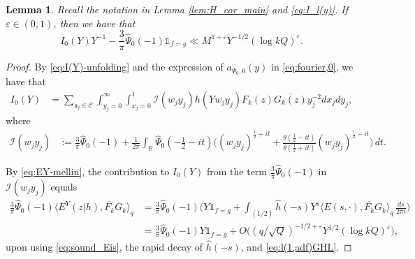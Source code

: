 \documentclass[12pt,reqno]{amsart}
\newtheorem{lem}[thm]{Lemma}
\theoremstyle{remark}
\numberwithin{equation}{section}
\begin{document}
        \begin{lem}
        \label{lem:I_0(Y)}
            Recall the notation in Lemma \ref{lem:H_cor_main} and \eqref{eq:I_l(y)}. If $\varepsilon \in (0,1)$, then we have that
            \[
           I_0(Y)Y^{-1} - \frac{3}{\pi}\widehat{\Psi}_0(-1)\mathds{1}_{f=g} \ll M^{1+\varepsilon}Y^{-1/2}(\log kQ)^\varepsilon.
            \]
        \end{lem}
        \begin{proof} By \eqref{eq:I(Y)-unfolding} and the expression of $a_{\Psi_0,0}(y)$ in \eqref{eq:fourier,0}, we have that
        \begin{align}
        \label{eq:IES-1}
		I_0(Y)
        &= \sum_{\mathfrak{a}_j \in \mathcal{C}} \int_{y_j=0}^{\infty}\int_{x_j =0}^1 \mathscr{I}(w_j y_j)h(Yw_jy_j) F_k(z)\overline{G_k(z)}  {y_j^{-2}}dx_jdy_j,
        \end{align}
        where
        \begin{align*}
        \mathscr{I}(w_jy_j) &:=   \frac{3}{\pi}\widehat{\Psi}_0(-1)
        + \frac{1}{2\pi}\int_\mathbb{R} \widehat{\Psi}_0(-\tfrac{1}{2}-it)
        \Big((w_jy_j)^{\frac{1}{2}+it} + \frac{\theta(\frac{1}{2}-it)}{\theta(\frac{1}{2}+it)}(w_jy_j)^{\frac{1}{2}-it}\Big)\, dt.
	\end{align*}
    
   
        By \eqref{eq:EY-mellin}, the contribution to $I_0(Y)$ from the term $\frac{3}{\pi}\widehat{\Psi}_0(-1)$ in $\mathscr{I}(w_jy_j)$  equals
        \begin{equation}
        \begin{aligned}
        \label{eq:cor-IES-5}
            \frac{3}{\pi}\widehat{\Psi}_0(-1) \langle E^Y(z|h), \overline{F_k}G_k\rangle_q 
            &=\frac{3}{\pi}\widehat{\Psi}_0(-1)\Big(Y \mathds{1}_{f=g}+ \int_{(1/2)}\widehat{h}(-s)Y^s \langle E(s,\cdot), \overline{F_k}G_k\rangle_q \,\frac{ds}{2\pi i}\Big)\\
            &= \frac{3}{\pi}\widehat{\Psi}_0(-1)Y\mathds{1}_{f=g} + O\Big((q/\sqrt{Q})^{-1/2+\varepsilon}Y^{1/2}(\log kQ)^{\varepsilon}\Big),
            \end{aligned}
		\end{equation}
  upon using \eqref{eq:sound_Eis},  
  the rapid decay of $\widehat{h}(-s)$, and \eqref{eq:l(1,adf)GHL}.


\end{proof}
\end{document}
